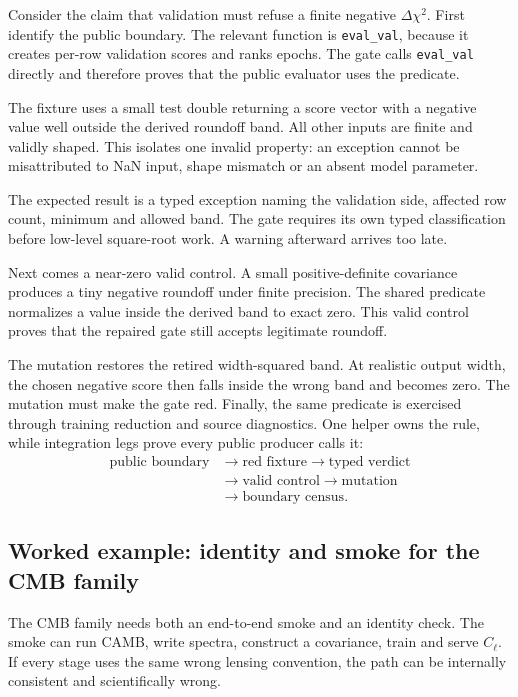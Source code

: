 \documentclass[10pt,aps,prd,twocolumn,nofootinbib]{revtex4-2}
\newcommand{\code}[1]{\texttt{#1}}
\begin{document}
Consider the claim that validation must refuse a finite negative
\(\Delta\chi^2\).  First identify the public boundary.  The relevant function
is \code{eval\_val}, because it creates per-row validation scores and ranks
epochs.  The gate calls \code{eval\_val} directly and therefore proves that
the public evaluator uses the predicate.

The fixture uses a small test double returning a score vector with a negative
value well outside the derived roundoff band.  All other inputs are finite and
validly shaped.  This isolates one invalid property: an exception cannot be
misattributed to NaN input, shape mismatch or an absent model parameter.

The expected result is a typed exception naming the validation side, affected
row count, minimum and allowed band.  The gate requires its own typed
classification before low-level square-root work.  A warning afterward
arrives too late.

Next comes a near-zero valid control.  A small positive-definite covariance
produces a tiny negative roundoff under finite precision.  The shared
predicate normalizes a value inside the derived band to exact zero.  This
valid control proves that the repaired gate still accepts legitimate
roundoff.

The mutation restores the retired width-squared band.  At realistic output
width, the chosen negative score then falls inside the wrong band and becomes
zero.  The mutation must make the gate red.  Finally, the same predicate is
exercised through training reduction and source diagnostics.  One helper owns
the rule, while integration legs prove every public producer calls it:
\begin{align*}
\text{public boundary}&\rightarrow\text{red fixture}
\rightarrow\text{typed verdict}\\
&\rightarrow\text{valid control}
\rightarrow\text{mutation}\\
&\rightarrow\text{boundary census}.
\end{align*}

\subsection{Worked example: identity and smoke for the CMB family}

The CMB family needs both an end-to-end smoke and an identity check.  The smoke can run
CAMB, write spectra, construct a covariance, train and serve \(C_\ell\).
If every stage uses the same wrong lensing convention, the path can be
internally consistent and scientifically wrong.
\end{document}
